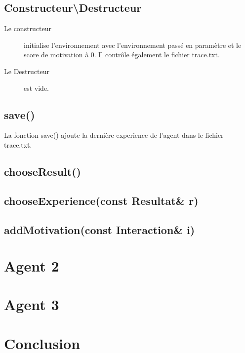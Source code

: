 \documentclass[11pt]{article}
\begin{document}
    \subsection{Constructeur\textbackslash{}Destructeur}
    
    
    
    \begin{description}
	\item[Le constructeur] initialise l'environnement avec l'environnement passé en paramètre et le score de motivation à 0.
	Il contrôle également le fichier trace.txt.
	\item[Le Destructeur] est vide.
      \end{description}
    
    
    \subsection{save()}
    
    
    
    La fonction save() ajoute la dernière experience de l'agent dans le fichier trace.txt.
    
    \subsection{chooseResult()}
    
    \subsection{chooseExperience(const Resultat\& r)}
    
    \subsection{addMotivation(const Interaction\& i)}
    
  \section{Agent 2}
  \section{Agent 3}
  \section{Conclusion}
\end{document}
